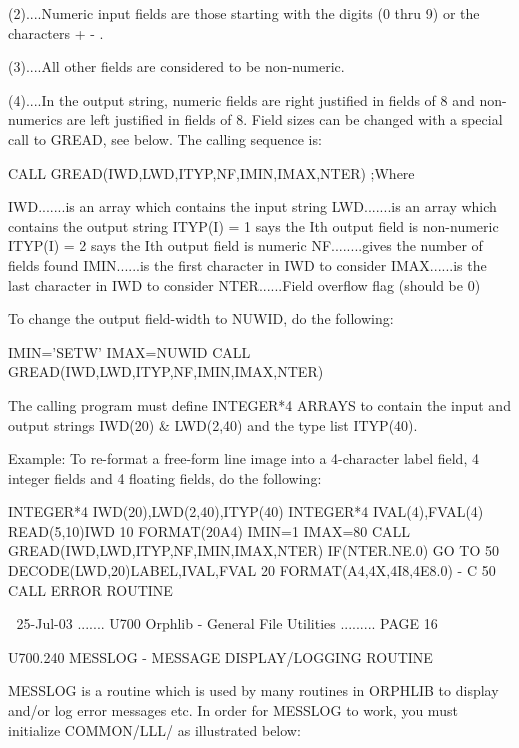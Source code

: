    (2)....Numeric  input  fields are those starting with the digits (0 thru 9)
          or the characters + - .
 
   (3)....All other fields are considered to be non-numeric.
 
   (4)....In the output string, numeric fields are right justified  in  fields
          of  8  and  non-numerics  are  left  justified in fields of 8. Field
          sizes can be changed with a special call to GREAD,  see  below.  The
          calling sequence is:
 
          CALL GREAD(IWD,LWD,ITYP,NF,IMIN,IMAX,NTER)   ;Where
 
          IWD.......is an array which contains the input string
          LWD.......is an array which contains the output string
          ITYP(I) = 1 says the Ith output field is non-numeric
          ITYP(I) = 2 says the Ith output field is numeric
          NF........gives the number of fields found
          IMIN......is the first character in IWD to consider
          IMAX......is the last  character in IWD to consider
          NTER......Field overflow flag (should be 0)
 
   To change the output field-width to NUWID, do the following:
 
          IMIN='SETW'
          IMAX=NUWID
          CALL GREAD(IWD,LWD,ITYP,NF,IMIN,IMAX,NTER)
 
   The  calling  program must define INTEGER*4 ARRAYS to contain the input and
   output strings IWD(20) & LWD(2,40) and the type list ITYP(40).
 
   Example: To re-format a free-form  line  image  into  a  4-character  label
   field, 4 integer fields and 4 floating fields, do the following:
 
         INTEGER*4 IWD(20),LWD(2,40),ITYP(40)
         INTEGER*4 IVAL(4),FVAL(4)
         READ(5,10)IWD
      10 FORMAT(20A4)
         IMIN=1
         IMAX=80
         CALL GREAD(IWD,LWD,ITYP,NF,IMIN,IMAX,NTER)
         IF(NTER.NE.0) GO TO 50
         DECODE(LWD,20)LABEL,IVAL,FVAL
      20 FORMAT(A4,4X,4I8,4E8.0)
         -
   C  50 CALL ERROR ROUTINE
 
    
   25-Jul-03 ....... U700  Orphlib - General File Utilities ......... PAGE  16
 
 
   U700.240  MESSLOG  - MESSAGE DISPLAY/LOGGING ROUTINE
 
   MESSLOG  is  a routine which is used by many routines in ORPHLIB to display
   and/or log error messages etc. In order  for  MESSLOG  to  work,  you  must
   initialize COMMON/LLL/ as illustrated below:
 
